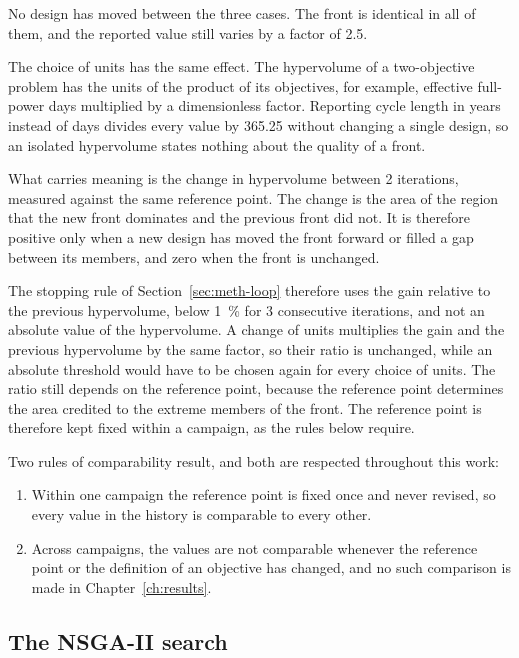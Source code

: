 No design has moved between the three cases. The front is identical in
all of them, and the reported value still varies by a factor of 2.5.

The choice of units has the same effect. The hypervolume of a
two-objective problem has the units of the product of its objectives,
for example, effective full-power days multiplied by a dimensionless
factor. Reporting cycle length in years instead of days divides every
value by 365.25 without changing a single design, so an isolated
hypervolume states nothing about the quality of a front.

What carries meaning is the change in hypervolume between 2
iterations, measured against the same reference point. The change is
the area of the region that the new front dominates and the previous
front did not. It is therefore positive only when a new design has moved
the front forward or filled a gap between its members, and zero when
the front is unchanged.

The stopping rule of Section~\ref{sec:meth-loop} therefore uses the gain
relative to the previous hypervolume, below \SI{1}{\percent} for 3
consecutive iterations, and not an absolute value of the hypervolume. A
change of units multiplies the gain and the previous hypervolume by the
same factor, so their ratio is unchanged, while an absolute threshold
would have to be chosen again for every choice of units. The ratio still
depends on the reference point, because the reference point determines the area credited to the extreme members of the front. The reference point
is therefore kept fixed within a campaign, as the rules below require.

Two rules of comparability result, and both are respected throughout
this work:

\begin{enumerate}
  \item Within one campaign the reference point is fixed once and never
        revised, so every value in the history is comparable to every
        other.

  \item Across campaigns, the values are not comparable whenever the
        reference point or the definition of an objective has changed,
        and no such comparison is made in Chapter~\ref{ch:results}.
\end{enumerate}

\subsection{The NSGA-II search}
\label{sec:bg-nsga2}

